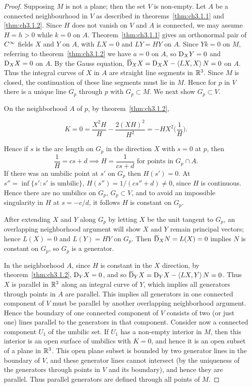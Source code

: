 \documentclass[../main]{subfiles}
\begin{document}
\begin{proof}
Supposing $M$ is not a plane; then the set $V$ is non-empty. Let $A$ be a connected neighbourhood in $V$ as described in theorems~\ref{thm:ch3.1.1} and \ref{thm:ch3.1.2}. Since $H$ does not vanish on $V$ and $A$ is connected, we may assume $H = h > 0$ while $k = 0$ on $A$. Theorem~\ref{thm:ch3.1.1} gives an orthonormal pair of $C^\infty$ fields $X$ and $Y$ on $A$, with $LX = 0$ and $LY = HY$ on $A$. Since $Yk = 0$ on $M$, referring to theorem~\ref{thm:ch3.1.2} we have $a = 0$ on $A$, so $\mathrm{D}_X Y = 0$ and $\mathrm{D}_X X = 0$ on $A$. By the Gauss equation, $\covariant_X X = \connection_X X - \ip {L X} X N = 0$ on $A$. Thus the integral curves of $X$ in $A$ are straight line segments in $\mathbb{R}^3$. Since $M$ is closed, the continuation of these line segments must lie in $M$. Hence for $p$ in $V$ there is a unique line $G_p$ through $p$ with $G_p \subset M$. We next show $G_p \subset V$.

On the neighborhood $A$ of $p$, by theorem~\ref{thm:ch3.1.2},

\[
K = 0 = \frac {X^2 H} H - \frac {2(XH)^2} {H^2} = -HX^2 \biggl(\frac 1 H\biggr).
\]

Hence if $s$ is the arc length on $G_p$ in the direction $X$ with $s = 0$ at $p$, then \[\dfrac{1}{H} = cs +d \implies H = \dfrac{1}{cs + d}\text{ for points in }G_p \cap A.\]If there was an umbilic point at $s'$ on $G_p$ then $H(s') = 0$. At \newline $s'' = \inf \{s' : s' \text { is umbilic}\}$, $H(s'') = 1/(cs'' + d) \ne 0$, since $H$ is continuous. Hence there are no umbilics on $G_p$, $G_p \subset V$, and to avoid an impossible singularity in $H$ at $s = -c/d$, it follows $H$ is constant on $G_p$. 

After extending $X$ and $Y$ along $G_p$ by letting $X$ be the unit tangent to $G_p$, an overlapping neighborhood argument will show $X$ and $Y$ remain principal vectors; hence $L(X) = 0$ and $L(Y) = HY$ on $G_p$. Then $\covariant_X N = L(X) = 0$ implies $N$ is constant on $G_p$, so $G_p$ is a generator.

In the neighborhood $A$, since $H$ is constant in the $X$ direction, by theorem~\ref{thm:ch3.1.2}, $\mathrm{D}_Y X = 0$, and so $\covariant_Y X = \connection_Y X - \ip {LX} Y N = 0$. Thus $X$ is parallel in $\mathbb{R}^3$ along an integral curve of $Y$, which implies all generators through points in $A$ are parallel. This implies all generators in one connected component of $V$ must be parallel by another overlapping neighborhood argument. Hence the boundary of one connected component of $V$ consists of two (or just one) lines parallel to the generators in that component. Consider now a connected component $U_1$ of the umbilic set. If $U_1$ has a non-empty interior in $M$, then this interior is an open surface of umbilics with $K = 0$, and hence it is an open subset of a plane in $\mathbb{R}^{3}$. This open plane subset is bounded by two generator lines in the boundary of $V$, and these generator lines cannot intersect (by the uniqueness of the generators through points in $V$ and its boundary), and hence they are parallel. Thus parallel generators are defined through all points of $M$.
\end{proof}
\end{document}
